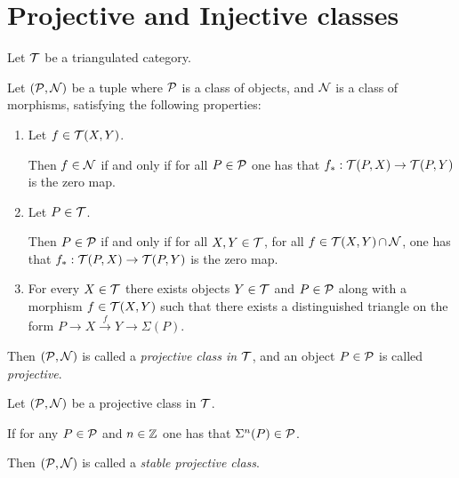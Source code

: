 \section{Projective and Injective classes}

\begin{definition} \label{def:projective_class}
    Let \( {\mathcal{T}} \) be a triangulated category.

    Let \( ({\mathcal{P}}, {\mathcal{N}}) \) be a tuple where \( {\mathcal{P}} \) is a class of objects, and \( {\mathcal{N}} \) is a class of morphisms, satisfying the following properties:

    \begin{enumerate}
        \item {Let \( f \in {\mathcal{T}}(X, Y) \).
        
        Then \( f \in {\mathcal{N}} \) if and only if for all \( P \in {\mathcal{P}} \) one has that \( f_*: {\mathcal{T}}(P, X) \to {\mathcal{T}}(P, Y) \) is the zero map.}

        \item {Let \( P \in {\mathcal{T}} \).
        
        Then \( P \in {\mathcal{P}} \) if and only if for all \( X, Y \in {\mathcal{T}} \), for all \( f \in {\mathcal{T}}(X, Y) \mathop{\cap}\limits {\mathcal{N}} \), one has that \( f_*: {\mathcal{T}}(P, X) \to {\mathcal{T}}(P, Y) \) is the zero map.}

        \item {For every \( X \in {\mathcal{T}} \) there exists objects \( Y \in {\mathcal{T}} \) and \( P \in {\mathcal{P}} \) along with a morphism \( f \in {\mathcal{T}}(X, Y) \) such that there exists a distinguished triangle on the form \( P \to X \stackrel{f}{\to} Y \to \Sigma(P) \).}
    \end{enumerate}

    Then \( ({\mathcal{P}}, {\mathcal{N}}) \) is called a \emph{projective class in \( {\mathcal{T}} \)}, and an object \( P \in {\mathcal{P}} \) is called \emph{projective}. %
\end{definition}

\begin{definition}
    Let \( ({\mathcal{P}}, {\mathcal{N}}) \) be a projective class in \( {\mathcal{T}} \).

    If for any \( P \in {\mathcal{P}} \) and \( n \in {\mathbb{Z}} \) one has that \( \Sigma^n(P) \in {\mathcal{P}} \).
    
    Then \( ({\mathcal{P}}, {\mathcal{N}}) \) is called a \emph{stable projective class}.
\end{definition}


